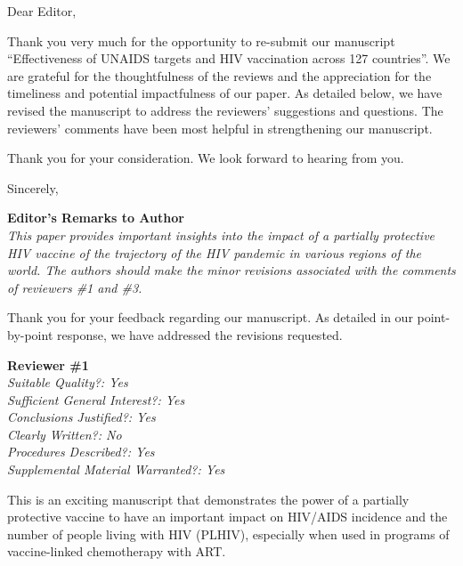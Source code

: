 \documentclass[12pt]{jpmletter}
\newcommand{\section}[1]{\textbf{#1}\\}
\newenvironment{original}{\it}{}
\begin{document}
  \begin{letter}{}

    \opening{Dear Editor,}

    Thank you very much for the opportunity to re-submit our
    manuscript ``Effectiveness of UNAIDS targets and HIV
    vaccination across 127 countries''. We are grateful for the
    thoughtfulness of the reviews and the appreciation for the
    timeliness and potential impactfulness of our paper. As detailed
    below, we have revised the manuscript to address the reviewers’
    suggestions and questions. The reviewers’ comments have been most
    helpful in strengthening our manuscript.

    Thank you for your consideration. We look forward to hearing from
    you.

    \closing{Sincerely,}

    \newpage

    \section{Editor's Remarks to Author}
    \begin{original}
      This paper provides important insights into the impact of
      a partially protective HIV vaccine of the trajectory of the HIV
      pandemic in various regions of the world. The authors should
      make the minor revisions associated with the comments of
      reviewers \#1 and \#3.
    \end{original}

    Thank you for your feedback regarding our manuscript. As detailed
    in our point-by-point response, we have addressed the revisions
    requested.

    \section{Reviewer \#1}
    \begin{original}
      Suitable Quality?: Yes\\
      Sufficient General Interest?: Yes\\
      Conclusions Justified?: Yes\\
      Clearly Written?: No\\
      Procedures Described?: Yes\\
      Supplemental Material Warranted?: Yes

      This is an exciting manuscript that demonstrates the power of a
      partially protective vaccine to have an important impact on
      HIV/AIDS incidence and the number of people living with HIV
      (PLHIV), especially when used in programs of vaccine-linked
      chemotherapy with ART.
    \end{original}


\end{letter}
\end{document}
